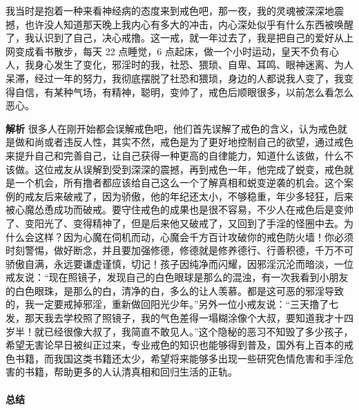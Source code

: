 \begin{case}
    我当时是抱着一种来看神经病的态度来到戒色吧，那一夜，我的灵魂被深深地震撼，也许没人知道那天晚上我内心有多大的冲击，内心深处似乎有什么东西被唤醒了，我认识到了自己，决心戒撸。这一戒，就一年过去了，我是把自己的爱好从上网变成看书散步，每天 22 点睡觉，6 点起床，做一个小时运动，皇天不负有心人，我身心发生了变化，邪淫时的我，社恐、猥琐、自卑、耳鸣、眼神迷离、为人呆滞，经过一年的努力，我彻底摆脱了社恐和猥琐，身边的人都说我人变了，我变得自信，有某种气场，有精神，聪明，变帅了，戒色后顺眼很多，以前怎么看怎么恶心。

    \textbf{解析} 很多人在刚开始都会误解戒色吧，他们首先误解了戒色的含义，认为戒色就是做和尚或者违反人性，其实不然，戒色是为了更好地控制自己的欲望，通过戒色来提升自己和完善自己，让自己获得一种更高的自律能力，知道什么该做，什么不该做。这位戒友从误解到受到深深的震撼，再到戒色一年，他完成了蜕变，戒色就是一个机会，所有撸者都应该给自己这么一个了解真相和蜕变逆袭的机会。这个案例的戒友后来破戒了，因为骄傲，他的年纪还太小，不够稳重，年少多轻狂，后来被心魔怂恿成功而破戒。要守住戒色的成果也是很不容易，不少人在戒色后是变帅了、变阳光了、变得精神了，但是后来他又破戒了，又回到了手淫的怪圈中去。为什么会这样？因为心魔在伺机而动，心魔会千方百计攻破你的戒色防火墙！你必须时刻警惕，做好断念，并且要加强修德，修德就是修养德行、行善积德，千万不可骄傲自满，永远要谦虚谨慎，切记！孩子因纯净而闪耀，因邪淫沉沦而暗淡，一位戒友说：“现在照镜子，发现自己的白色眼球是那么的混浊，有一次我看到小朋友的白色眼珠，是那么的白，清净的白，多么的让人羡慕。都是这可恶的邪淫导致的，我一定要戒掉邪淫，重新做回阳光少年。”另外一位小戒友说：“三天撸了七发，那天我去学校照了照镜子，我的气色差得一塌糊涂像个大叔，要知道我才十四岁半！就已经很像大叔了，我简直不敢见人。”这个隐秘的恶习不知毁了多少孩子，希望无害论早日被纠正过来，专业戒色的知识也能够得到普及，国外有上百本的戒色书籍，而我国这类书籍还太少，希望将来能够多出现一些研究色情危害和手淫危害的书籍，帮助更多的人认清真相和回归生活的正轨。
\end{case}

\paragraph*{总结}

